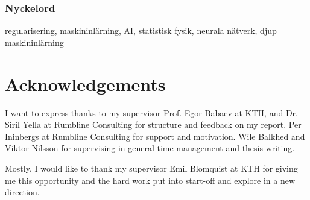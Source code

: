 \subsection*{Nyckelord}
regularisering, maskininlärning, AI, statistisk fysik, neurala nätverk, djup maskininlärning


\newpage
\thispagestyle{plain}
\chapter*{Acknowledgements}
I want to express thanks to my supervisor Prof. Egor Babaev at KTH, and Dr. Siril Yella at Rumbline Consulting for structure and feedback on my report. Per Ininbergs at Rumbline Consulting for support and motivation. Wile Balkhed and Viktor Nilsson for supervising in general time management and thesis writing. 

Mostly, I would like to thank my supervisor Emil Blomquist at KTH for giving me this opportunity and the hard work put into start-off and explore in a new direction.

\newpage

\thispagestyle{plain}

\tableofcontents

\newpage
{}

